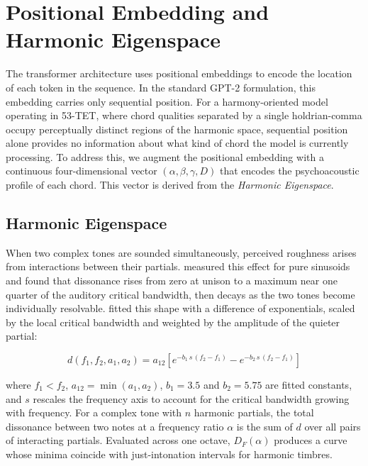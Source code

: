 \documentclass{aimc2026}
\begin{document}
\section{Positional Embedding and Harmonic Eigenspace}
\label{sec:eigenspace}

The transformer architecture uses positional embeddings to encode the location of each token in the sequence. In the standard GPT-2 formulation, this embedding carries only sequential position. For a harmony-oriented model operating in 53-TET, where chord qualities separated by a single holdrian-comma occupy perceptually distinct regions of the harmonic space, sequential position alone provides no information about what kind of chord the model is currently processing. To address this, we augment the positional embedding with a continuous four-dimensional vector $(\alpha, \beta, \gamma, D)$ that encodes the psychoacoustic profile of each chord. This vector is derived from the \textit{Harmonic Eigenspace}.

\subsection{Harmonic Eigenspace}

When two complex tones are sounded simultaneously, perceived roughness arises from interactions between their partials. \citet{plomp1965tonal} measured this effect for pure sinusoids and found that dissonance rises from zero at unison to a maximum near one quarter of the auditory critical bandwidth, then decays as the two tones become individually resolvable. \citet{sethares2005tuning} fitted this shape with a difference of exponentials, scaled by the local critical bandwidth and weighted by the amplitude of the quieter partial:

\begin{equation}
d(f_1, f_2, a_1, a_2) = a_{12} \left[ e^{-b_1\, s\, (f_2 - f_1)} - e^{-b_2\, s\, (f_2 - f_1)} \right]
\label{eq:pairwise}
\end{equation}

\noindent where $f_1 < f_2$, $a_{12} = \min(a_1, a_2)$, $b_1 = 3.5$ and $b_2 = 5.75$ are fitted constants, and $s$ rescales the frequency axis to account for the critical bandwidth growing with frequency. For a complex tone with $n$ harmonic partials, the total dissonance between two notes at a frequency ratio $\alpha$ is the sum of $d$ over all pairs of interacting partials. Evaluated across one octave, $D_F(\alpha)$ produces a curve whose minima coincide with just-intonation intervals for harmonic timbres.
\end{document}
